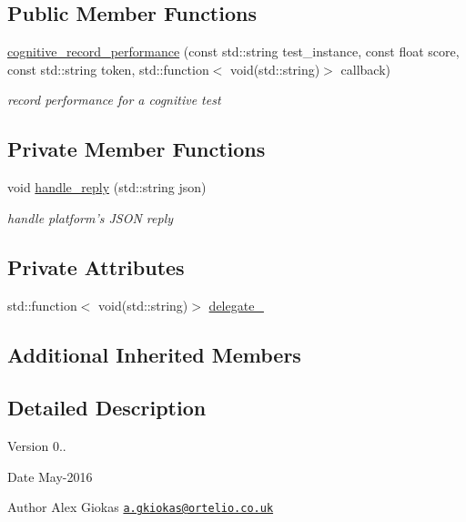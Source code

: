 \subsection*{Public Member Functions}
\begin{DoxyCompactItemize}
\item 
\hyperlink{classrapp_1_1cloud_1_1cognitive__record__performance_aefb5e0c3068468911c3e7b395bccb84e}{cognitive\-\_\-record\-\_\-performance} (const std\-::string test\-\_\-instance, const float score, const std\-::string token, std\-::function$<$ void(std\-::string)$>$ callback)
\begin{DoxyCompactList}\small\item\em record performance for a cognitive test \end{DoxyCompactList}\end{DoxyCompactItemize}
\subsection*{Private Member Functions}
\begin{DoxyCompactItemize}
\item 
void \hyperlink{classrapp_1_1cloud_1_1cognitive__record__performance_ad1be0132b4eb3d5ee69962907dcad0c1}{handle\-\_\-reply} (std\-::string json)
\begin{DoxyCompactList}\small\item\em handle platform's J\-S\-O\-N reply \end{DoxyCompactList}\end{DoxyCompactItemize}
\subsection*{Private Attributes}
\begin{DoxyCompactItemize}
\item 
std\-::function$<$ void(std\-::string)$>$ \hyperlink{classrapp_1_1cloud_1_1cognitive__record__performance_a3a5c55e9220a841ce2be749fd878427b}{delegate\-\_\-}
\end{DoxyCompactItemize}
\subsection*{Additional Inherited Members}


\subsection{Detailed Description}
\begin{DoxyVersion}{Version}
0.. 
\end{DoxyVersion}
\begin{DoxyDate}{Date}
May-\/2016 
\end{DoxyDate}
\begin{DoxyAuthor}{Author}
Alex Giokas \href{mailto:a.gkiokas@ortelio.co.uk}{\tt a.\-gkiokas@ortelio.\-co.\-uk} 
\end{DoxyAuthor}


